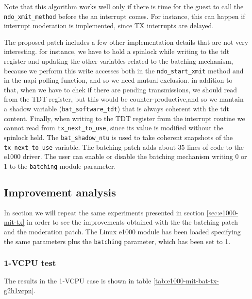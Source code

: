 Note that this algorithm works well only if there is time for the guest to call the \texttt{ndo\_xmit\_method} before the an interrupt
comes. For instance, this can happen if interrupt moderation is implemented, since TX interrupts are delayed.

\vspace{0.5cm}

The proposed patch includes a few other implementation details that are not very interesting. for instance, we have to hold a spinlock
while writing to the tdt register and updating the other variables related to the batching mechanism, because we perform this write
accesses both in the \texttt{ndo\_start\_xmit} method and in the napi polling function, and so we need mutual exclusion.
in addition to that, when we have to chek if there are pending transmissions, we should read from the TDT register, but this would be 
counter-productive,and so we mantain a shadow variable (\texttt{bat\_software\_tdt}) that is always coherent with the tdt content.
Finally, when writing to the TDT register from the interrupt routine we cannot read from \texttt{tx\_next\_to\_use}, since its value
is modified without the spinlock held. The \texttt{bat\_shadow\_ntu} is used to take coherent snapshots of the \texttt{tx\_next\_to\_use}
variable.
The batching patch adds about 35 lines of code to the e1000 driver.
The user can enable or disable the batching mechanism writing 0 or 1 to the \texttt{batching} module parameter.


\subsection{Improvement analysis}
\label{sec:e1000-mit-bat-tx}
In section we will repeat the same experiments presented in section \ref{sec:e1000-mit-tx} in order to see the improvements
obtained with the the batching patch and the moderation patch. The Linux e1000 module has been loaded specifying the same parameters 
plus the \texttt{batching} parameter, which has been set to 1.

\subsubsection{1-VCPU test}
The results in the 1-VCPU case is shown in table \ref{tab:e1000-mit-bat-tx-g2h1vcpu}.

